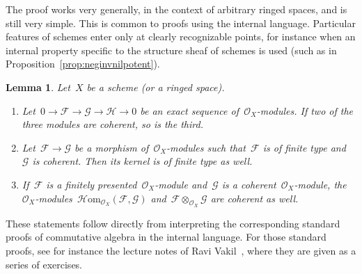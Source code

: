 \documentclass[10pt,reqno,a4paper]{amsbook}
\makeatletter
\theoremstyle{definition}
\theoremstyle{plain}
\newtheorem{lemma}[defn]{Lemma}
\theoremstyle{remark}
\newcommand{\F}{\mathcal{F}}
\renewcommand{\G}{\mathcal{G}}
\renewcommand{\H}{\mathcal{H}}
\renewcommand{\O}{\mathcal{O}}
\newcommand{\HOM}{\mathcal{H}\mathrm{om}}
\newcommand{\?}{\,{:}\,}
\renewcommand{\_}{\mathpunct{.}\,}
\renewenvironment{proof}[1][\proofname]{\par
  \pushQED{\qed}%
  \normalfont \topsep6\p@\@plus6\p@\relax
  \trivlist
  \item[\hskip\labelsep
        \itshape
    #1\@addpunct{.}]\ignorespaces
}{%
  \popQED\endtrivlist\@endpefalse
}
\makeatother
\begin{document}
The proof works very generally, in the context of arbitrary ringed
spaces, and is still very simple. This is common to proofs using the internal
language. Particular features of schemes enter only at clearly recognizable
points, for instance when an internal property specific to the structure sheaf
of schemes is used (such as in Proposition~\ref{prop:neginvnilpotent}).

\begin{lemma}\label{lemma:coherent-stuff}
Let~$X$ be a scheme (or a ringed space).
\begin{enumerate}
\item Let~$0 \to \F \to \G \to \H \to 0$ be an exact sequence
of~$\O_X$-modules. If two of the three modules are coherent, so is the third.
\item Let~$\F \to \G$ be a morphism of~$\O_X$-modules such that~$\F$ is
of finite type and~$\G$ is coherent. Then its kernel is of finite type as well.
\item If~$\F$ is a finitely presented~$\O_X$-module and~$\G$ is a
coherent~$\O_X$-module, the~$\O_X$-modules~$\HOM_{\O_X}(\F,\G)$ and~$\F \otimes_{\O_X} \G$
are coherent as well.
\end{enumerate}
\end{lemma}
\begin{proof}These statements follow directly from interpreting the
corresponding standard proofs of commutative algebra in the internal language.
For those standard proofs, see for instance the lecture notes of Ravi
Vakil~\cite[Section~13.8]{vakil:foag}, where they are given as a series of
exercises.
\end{proof}
\end{document}
